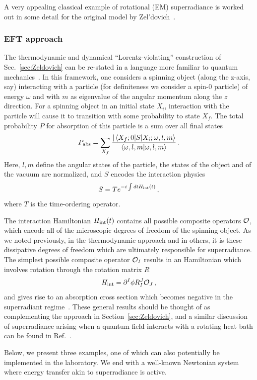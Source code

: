 \documentclass[11pt]{article}
\newcommand{\be}{\begin{equation}}
\newcommand{\ee}{\end{equation}}
\numberwithin{equation}{section} %
\begin{document}
A very appealing classical example of rotational (EM) superradiance is worked out in some detail for the 
original model by Zel'dovich~\cite{zeldovich2,Bekenstein:1998nt}.

\subsubsection{EFT approach}
The thermodynamic and dynamical ``Lorentz-violating'' construction of Sec.~\ref{sec:Zeldovich} can be re-stated in a 
language more familiar to quantum mechanics~\cite{Endlich:2016jgc,Porto:2016pyg}. In this framework, one considers a spinning object 
(along the z-axis, say) interacting with a particle (for definiteness we consider a spin-0 particle) of energy $\omega$ 
and with $m$ as eigenvalue of the angular momentum along the $z$ direction. For a spinning object in an initial state 
$X_i$, interaction with the particle will cause it to transition with some probability to state $X_f$. The total probability $P$ for absorption of this particle is a sum over all final states
%
\be
P_{\rm abs}=\sum_{X_f}\frac{|\left<X_f;0|S|X_i;\omega,l,m\right>}{\left<\omega,l,m|\omega,l,m\right>}\,.
\ee
%
Here, $l,m$ define the angular states of the particle, the states of the object and of the vacuum are normalized, and $S$ encodes the interaction physics
%
\be
S=Te^{-i\int dt H_{\rm int}(t)}\,,
\ee
%
where $T$ is the time-ordering operator. 

The interaction Hamiltonian $H_{\rm int}(t)$ contains all possible composite operators ${\cal O}$, which encode all of the microscopic degrees of freedom of the spinning object.
As we noted previously, in the thermodynamic approach and in others, it is these dissipative degrees of freedom which 
are ultimately responsible for superradiance. The simplest possible composite operator ${\cal O}_I$ results in an 
Hamiltonian which involves rotation through the rotation matrix $R$
%
\be
H_{\rm int}=\partial^I \phi R_I^J{\cal O}_J\,,
\ee
%
and gives rise to an absorption cross section which becomes negative in the superradiant regime~\cite{Endlich:2016jgc,Porto:2016pyg}. These general results should be thought of as complementing the approach in Section~\ref{sec:Zeldovich}, and a similar discussion of superradiance
arising when a quantum field interacts with a rotating heat bath can be found in Ref.~\cite{Alicki:2017bgh}.


Below, we present three examples, one of which can also potentially be implemented in the laboratory.
We end with a well-known Newtonian system where energy transfer akin to superradiance is active.
\end{document}

